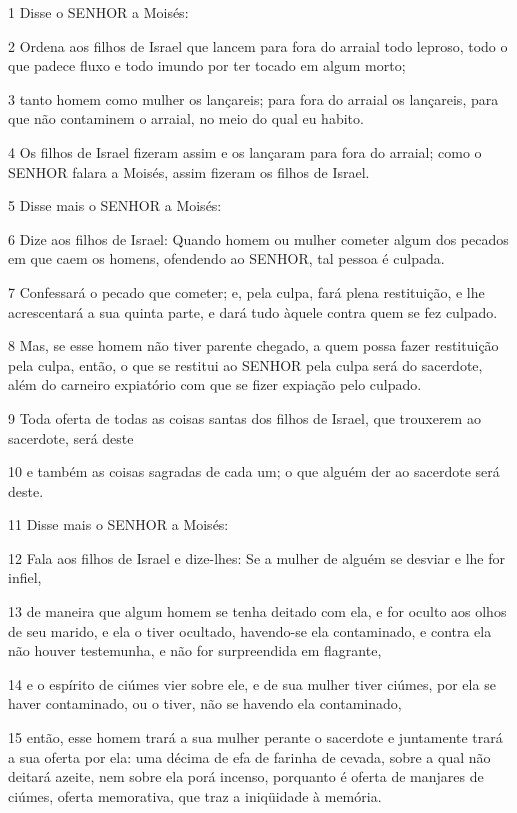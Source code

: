 \par 1 Disse o SENHOR a Moisés:
\par 2 Ordena aos filhos de Israel que lancem para fora do arraial todo leproso, todo o que padece fluxo e todo imundo por ter tocado em algum morto;
\par 3 tanto homem como mulher os lançareis; para fora do arraial os lançareis, para que não contaminem o arraial, no meio do qual eu habito.
\par 4 Os filhos de Israel fizeram assim e os lançaram para fora do arraial; como o SENHOR falara a Moisés, assim fizeram os filhos de Israel.
\par 5 Disse mais o SENHOR a Moisés:
\par 6 Dize aos filhos de Israel: Quando homem ou mulher cometer algum dos pecados em que caem os homens, ofendendo ao SENHOR, tal pessoa é culpada.
\par 7 Confessará o pecado que cometer; e, pela culpa, fará plena restituição, e lhe acrescentará a sua quinta parte, e dará tudo àquele contra quem se fez culpado.
\par 8 Mas, se esse homem não tiver parente chegado, a quem possa fazer restituição pela culpa, então, o que se restitui ao SENHOR pela culpa será do sacerdote, além do carneiro expiatório com que se fizer expiação pelo culpado.
\par 9 Toda oferta de todas as coisas santas dos filhos de Israel, que trouxerem ao sacerdote, será deste
\par 10 e também as coisas sagradas de cada um; o que alguém der ao sacerdote será deste.
\par 11 Disse mais o SENHOR a Moisés:
\par 12 Fala aos filhos de Israel e dize-lhes: Se a mulher de alguém se desviar e lhe for infiel,
\par 13 de maneira que algum homem se tenha deitado com ela, e for oculto aos olhos de seu marido, e ela o tiver ocultado, havendo-se ela contaminado, e contra ela não houver testemunha, e não for surpreendida em flagrante,
\par 14 e o espírito de ciúmes vier sobre ele, e de sua mulher tiver ciúmes, por ela se haver contaminado, ou o tiver, não se havendo ela contaminado,
\par 15 então, esse homem trará a sua mulher perante o sacerdote e juntamente trará a sua oferta por ela: uma décima de efa de farinha de cevada, sobre a qual não deitará azeite, nem sobre ela porá incenso, porquanto é oferta de manjares de ciúmes, oferta memorativa, que traz a iniqüidade à memória.
